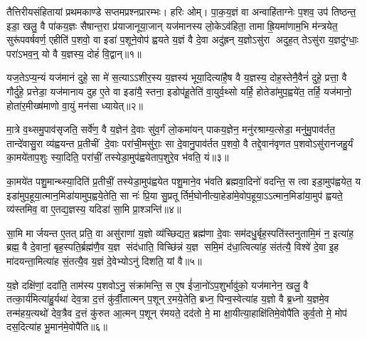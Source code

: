 {\anuvakamend[{वृ॒त्र॒हत्येऽनु॑ गाय॒त्रिणोऽध्व॒राणां परा॒वतो॒ऽस्याम॒ष्टाच॑त्वारिशच्च॥12॥}]}

\setcounter{anuvakam}{0}
तैत्तिरीयसंहितायां प्रथमकाण्डे सप्तमप्रश्नप्रारम्भः। हरिः ओम्। पा॒क॒य॒ज्ञं वा अन्वाहि॑ताग्नेः प॒शव॒ उप॑ तिष्ठन्त॒ इडा॒ खलु॒ वै पा॑कय॒ज्ञः सैषान्त॒रा प्र॑याजानूया॒जान् यज॑मानस्य लो॒केऽव॑हिता॒ तामाह्रि॒यमा॑णाम॒भि म॑न्त्रयेत॒ सुरू॑पवर्\mbox{}षवर्ण॒ एहीति॑ प॒शवो॒ वा इडा॑ प॒शूने॒वोप॑ ह्वयते य॒ज्ञं वै दे॒वा अदु॑ह्रन् य॒ज्ञोऽसु॑रा अदुह॒त् तेऽसु॑रा य॒ज्ञदु॑ग्धाः॒ परा॑ऽभव॒न्॒ यो वै य॒ज्ञस्य॒ दोहं॑ वि॒द्वान्॥१॥

यज॒तेऽप्य॒न्यं यज॑मानं दुहे॒ सा मे॑ स॒त्याऽऽशीर॒स्य य॒ज्ञस्य॑ भूया॒दित्या॑है॒ष वै य॒ज्ञस्य॒ दोह॒स्तेनै॒वैनं॑ दुहे॒ प्रत्ता॒ वै गौर्दु॑हे॒ प्रत्तेडा॒ यज॑मानाय दुह ए॒ते वा इडा॑यै॒ स्तना॒ इडोप॑हू॒तेति॑ वा॒युर्व॒थ्सो यर्\mbox{}हि॒ होतेडा॑मुप॒ह्वये॑त॒ तर्\mbox{}हि॒ यज॑मानो॒ होता॑र॒मीख्ष॑माणो वा॒युं मन॑सा ध्यायेत्॥२॥

मा॒त्रे व॒थ्समु॒पाव॑सृजति॒ सर्वे॑ण॒ वै य॒ज्ञेन॑ दे॒वाः सु॑व॒र्गं लो॒कमा॑यन् पाकय॒ज्ञेन॒ मनु॑रश्राम्य॒त्सेडा॒ मनु॑मु॒पाव॑र्तत॒ तान्दे॑वासु॒रा व्य॑ह्वयन्त प्र॒तीचीं दे॒वाः परा॑ची॒मसु॑राः॒ सा दे॒वानु॒पाव॑र्तत प॒शवो॒ वै तद्दे॒वान॑वृणत प॒शवोऽसु॑रानजहु॒र्यं का॒मये॑ताप॒शुः स्या॒दिति॒ परा॑चीं॒ तस्येडा॒मुप॑ह्वयेताप॒शुरे॒व भ॑वति॒ यं॥३॥

का॒मये॑त पशु॒मान्थ्स्या॒दिति॑ प्र॒तीचीं॒ तस्येडा॒मुप॑ह्वयेत पशु॒माने॒व भ॑वति ब्रह्मवा॒दिनो॑ वदन्ति॒ स त्वा इडा॒मुप॑ह्वयेत॒ य इडा॑मुप॒हूया॒त्मान॒मिडा॑यामुप॒ह्वये॒तेति॒ सा नः॑ प्रि॒या सु॒प्रतूर्तिर्म॒घोनीत्या॒हेडा॑मे॒वोप॒हूया॒ऽऽत्मान॒मिडा॑या॒मुप॑ ह्वयते॒ व्य॑स्तमिव॒ वा ए॒तद्य॒ज्ञस्य॒ यदिडा॑ सा॒मि प्रा॒श्ञन्ति॑॥४॥

सा॒मि मार्जयन्त ए॒तत् प्रति॒ वा असु॑राणां य॒ज्ञो व्य॑च्छिद्यत॒ ब्रह्म॑णा दे॒वाः सम॑दधु॒र्बृह॒स्पति॑स्तनुतामि॒मं न॒ इत्या॑ह॒ ब्रह्म॒ वै दे॒वानां॒ बृह॒स्पति॒र्ब्रह्म॑णै॒व य॒ज्ञ संद॑धाति॒ विच्छि॑न्नं य॒ज्ञ समि॒मं द॑धा॒त्वित्या॑ह॒ संत॑त्यै॒ विश्वे॑ दे॒वा इ॒ह मा॑दयन्ता॒मित्या॑ह सं॒तत्यै॒व य॒ज्ञं दे॒वेभ्योऽनु॑ दिशति॒ यां वै॥५॥

य॒ज्ञे दक्षि॑णां॒ ददा॑ति॒ ताम॑स्य प॒शवोऽनु॒ संक्रा॑मन्ति॒ स ए॒ष ई॑जा॒नो॑ऽप॒शुर्भावु॑को॒ यज॑मानेन॒ खलु॒ वै तत्का॒र्य॑मित्या॑हु॒र्यथा॑ देव॒त्रा द॒त्तं कु॑र्वी॒तात्मन् प॒शून् र॒मये॒तेति॒ ब्रध्न॒ पिन्व॒स्वेत्या॑ह य॒ज्ञो वै ब्र॒ध्नो य॒ज्ञमे॒व तन्म॑हय॒त्यथो॑ देव॒त्रैव द॒त्तं कु॑रुत आ॒त्मन् प॒शून् र॑मयते॒ दद॑तो मे॒ मा क्षा॒यीत्या॒हाक्षि॑तिमे॒वोपै॑ति कुर्व॒तो मे॒ मोप॑ दस॒दित्या॑ह भू॒मान॑मे॒वोपै॑ति॥६॥

